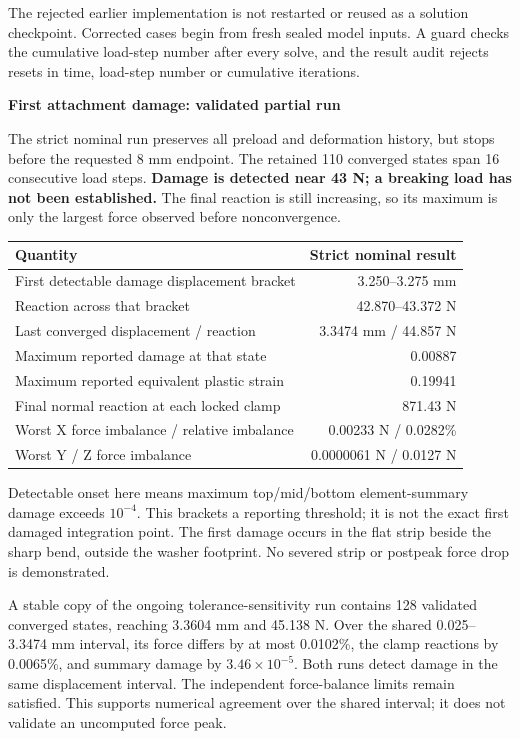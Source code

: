 \documentclass[10pt,a4paper]{article}
\newcommand{\PageTitle}[1]{{\LARGE\bfseries\color{Navy}#1\par}\vspace{7pt}}
\begin{document}
The rejected earlier implementation is not restarted or reused as a solution checkpoint. Corrected cases begin from fresh sealed model inputs. A guard checks the cumulative load-step number after every solve, and the result audit rejects resets in time, load-step number or cumulative iterations.


\clearpage
\PageTitle{First attachment damage: validated partial run}
The strict nominal run preserves all preload and deformation history, but stops before the requested 8 mm endpoint. The retained 110 converged states span 16 consecutive load steps. \textbf{Damage is detected near 43 N; a breaking load has not been established.} The final reaction is still increasing, so its maximum is only the largest force observed before nonconvergence.

\begin{center}
\begin{tabular}{p{.62\linewidth}r}\toprule
Quantity & Strict nominal result\\\midrule
First detectable damage displacement bracket & 3.250--3.275 mm\\
Reaction across that bracket & 42.870--43.372 N\\
Last converged displacement / reaction & 3.3474 mm / 44.857 N\\
Maximum reported damage at that state & 0.00887\\
Maximum reported equivalent plastic strain & 0.19941\\
Final normal reaction at each locked clamp & 871.43 N\\
Worst X force imbalance / relative imbalance & 0.00233 N / 0.0282\%\\
Worst Y / Z force imbalance & 0.0000061 N / 0.0127 N\\\bottomrule
\end{tabular}
\end{center}
Detectable onset here means maximum top/mid/bottom element-summary damage exceeds $10^{-4}$. This brackets a reporting threshold; it is not the exact first damaged integration point. The first damage occurs in the flat strip beside the sharp bend, outside the washer footprint. No severed strip or postpeak force drop is demonstrated.

A stable copy of the ongoing tolerance-sensitivity run contains 128 validated converged states, reaching 3.3604 mm and 45.138 N. Over the shared 0.025--3.3474 mm interval, its force differs by at most 0.0102\%, the clamp reactions by 0.0065\%, and summary damage by $3.46\times10^{-5}$. Both runs detect damage in the same displacement interval. The independent force-balance limits remain satisfied. This supports numerical agreement over the shared interval; it does not validate an uncomputed force peak.
\end{document}
